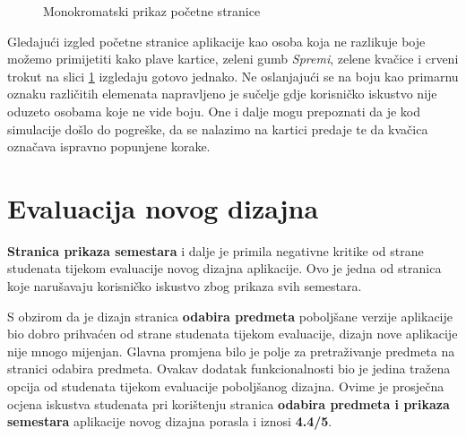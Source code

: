\documentclass[times, utf8, zavrsni, numeric]{fer}
\begin{document}
    \begin{figure} [H]
      \centering
      \caption{Monokromatski prikaz početne stranice}
      \label{fig:gray}
    \end{figure}
    
    Gledajući izgled početne stranice aplikacije kao osoba koja ne razlikuje boje možemo primijetiti kako plave kartice, zeleni gumb \textit{Spremi}, zelene kvačice i crveni trokut na slici \ref{fig:gray} izgledaju gotovo jednako. Ne oslanjajući se na boju kao primarnu oznaku različitih elemenata napravljeno je sučelje gdje korisničko iskustvo nije oduzeto osobama koje ne vide boju. One i dalje mogu prepoznati da je kod simulacije došlo do pogreške, da se nalazimo na kartici predaje te da kvačica označava ispravno popunjene korake.

    \section{Evaluacija novog dizajna}
    
    \textbf{Stranica prikaza semestara} i dalje je primila negativne kritike od strane studenata tijekom evaluacije novog dizajna aplikacije. Ovo je jedna od stranica koje narušavaju korisničko iskustvo zbog prikaza svih semestara.
    
    S obzirom da je dizajn stranica \textbf{odabira predmeta} poboljšane verzije aplikacije bio dobro prihvaćen od strane studenata tijekom evaluacije, dizajn nove aplikacije nije mnogo mijenjan. Glavna promjena bilo je polje za pretraživanje predmeta na stranici odabira predmeta. Ovakav dodatak funkcionalnosti bio je jedina tražena opcija od studenata tijekom evaluacije poboljšanog dizajna. Ovime je prosječna ocjena iskustva studenata pri korištenju stranica \textbf{odabira predmeta i prikaza semestara} aplikacije novog dizajna porasla i iznosi \textbf{4.4/5}.
    
\end{document}
